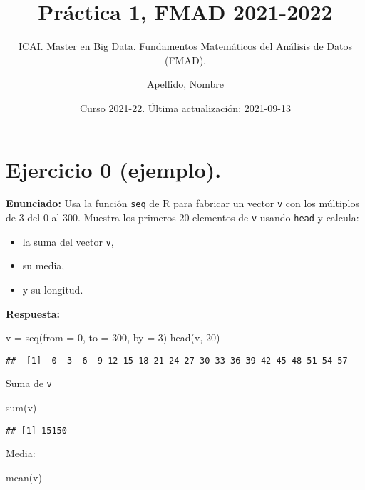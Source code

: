 \documentclass[
]{article}
\title{Práctica 1, FMAD 2021-2022}
\subtitle{ICAI. Master en Big Data. Fundamentos Matemáticos del Análisis
de Datos (FMAD).}
\author{Apellido, Nombre}
\date{Curso 2021-22. Última actualización: 2021-09-13}
\newenvironment{Shaded}{\begin{snugshade}}{\end{snugshade}}
\newcommand{\AttributeTok}[1]{\textcolor[rgb]{0.77,0.63,0.00}{#1}}
\newcommand{\DecValTok}[1]{\textcolor[rgb]{0.00,0.00,0.81}{#1}}
\newcommand{\FunctionTok}[1]{\textcolor[rgb]{0.00,0.00,0.00}{#1}}
\newcommand{\NormalTok}[1]{#1}
\newcommand{\OtherTok}[1]{\textcolor[rgb]{0.56,0.35,0.01}{#1}}
\providecommand{\tightlist}{%
  \setlength{\itemsep}{0pt}\setlength{\parskip}{0pt}}
\begin{document}
\maketitle

\hypertarget{ejercicio-0-ejemplo.}{%
\section{Ejercicio 0 (ejemplo).}\label{ejercicio-0-ejemplo.}}

\textbf{Enunciado:} Usa la función \texttt{seq} de R para fabricar un
vector \texttt{v} con los múltiplos de 3 del 0 al 300. Muestra los
primeros 20 elementos de \texttt{v} usando \texttt{head} y calcula:

\begin{itemize}
\tightlist
\item
  la suma del vector \texttt{v},
\item
  su media,
\item
  y su longitud.
\end{itemize}

\textbf{Respuesta:}

\begin{Shaded}
\begin{Highlighting}[]
\NormalTok{v }\OtherTok{=} \FunctionTok{seq}\NormalTok{(}\AttributeTok{from =} \DecValTok{0}\NormalTok{, }\AttributeTok{to =} \DecValTok{300}\NormalTok{, }\AttributeTok{by =} \DecValTok{3}\NormalTok{)}
\FunctionTok{head}\NormalTok{(v, }\DecValTok{20}\NormalTok{)}
\end{Highlighting}
\end{Shaded}

\begin{verbatim}
##  [1]  0  3  6  9 12 15 18 21 24 27 30 33 36 39 42 45 48 51 54 57
\end{verbatim}

Suma de \texttt{v}

\begin{Shaded}
\begin{Highlighting}[]
\FunctionTok{sum}\NormalTok{(v)}
\end{Highlighting}
\end{Shaded}

\begin{verbatim}
## [1] 15150
\end{verbatim}

Media:

\begin{Shaded}
\begin{Highlighting}[]
\FunctionTok{mean}\NormalTok{(v)}
\end{Highlighting}
\end{Shaded}
\end{document}
